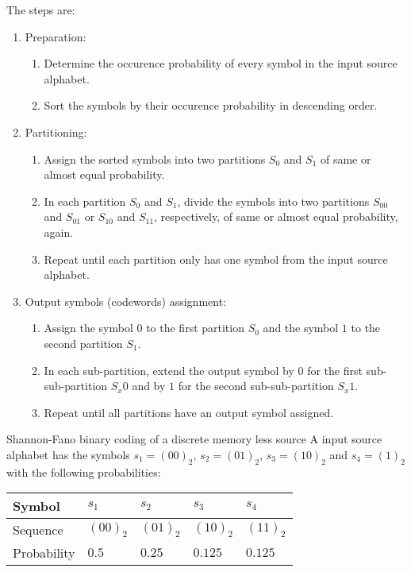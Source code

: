 \begin{refsection}
The steps are:
\begin{enumerate}
	\item Preparation:
	\begin{enumerate}
		\item Determine the occurence probability of every symbol in the input source alphabet.
		\item Sort the symbols by their occurence probability in descending order.
	\end{enumerate}
	\item Partitioning:
	\begin{enumerate}
		\item Assign the sorted symbols into two partitions $S_0$ and $S_1$ of same or almost equal probability.
		\item In each partition $S_0$ and $S_1$, divide the symbols into two partitions $S_{00}$ and $S_{01}$ or $S_{10}$ and $S_{11}$, respectively, of same or almost equal probability, again.
		\item Repeat until each partition only has one symbol from the input source alphabet.
	\end{enumerate}
	\item Output symbols (codewords) assignment:
	\begin{enumerate}
		\item Assign the symbol $0$ to the first partition $S_0$ and the symbol $1$ to the second partition $S_1$.
		\item In each sub-partition, extend the output symbol by $0$ for the first sub-sub-partition $S_x0$ and by $1$ for the second sub-sub-partition $S_x1$.
		\item Repeat until all partitions have an output symbol assigned.
	\end{enumerate}
\end{enumerate}

\begin{example}{Shannon-Fano binary coding of a discrete memory less source}
	A input source alphabet has the symbols $s_1 = (00)_2$, $s_2 = (01)_2$, $s_3 = (10)_2$ and $s_4 = (1)_2$ with the following probabilities:
	\begin{table}[H]
		\centering
		\begin{tabular}{|l|l|l|l|l|}
			\hline
			Symbol & $s_1$ & $s_2$ & $s_3$ & $s_4$ \\
			\hline
			Sequence & $(00)_2$ & $(01)_2$ & $(10)_2$ & $(11)_2$ \\
			\hline
			Probability & $0.5$ & $0.25$ & $0.125$ & $0.125$ \\
			\hline
		\end{tabular}
	\end{table}


\end{example}
\end{refsection}
